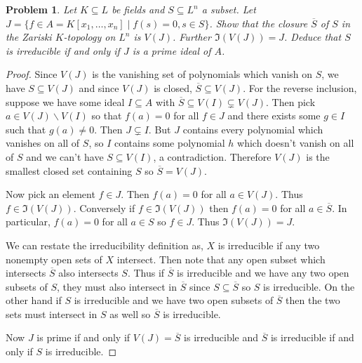 \documentclass{article}
\newtheorem{problem}{Problem}
\begin{document}
\begin{problem}
\label{zar}
Let $K \subseteq L$ be fields and $S \subseteq L^n$ a subset. Let $J = \{ f \in A = K[x_1, \dots , x_n] \mid f(s) = 0, s \in S\}$. Show that the closure $\overline{S}$ of $S$ in the Zariski $K$-topology on $L^n$ is $V(J)$. Further $\mathfrak{I}(V(J)) = J$. Deduce that $S$ is irreducible if and only if $J$ is a prime ideal of $A$.
\end{problem}
\begin{proof}
Since $V(J)$ is the vanishing set of polynomials which vanish on $S$, we have $S \subseteq V(J)$ and since $V(J)$ is closed, $\overline{S} \subseteq V(J)$. For the reverse inclusion, suppose we have some ideal $I \subseteq A$ with $\overline{S} \subseteq V(I) \subsetneq V(J)$. Then pick $a \in V(J) \backslash V(I)$ so that $f(a) = 0$ for all $f \in J$ and there exists some $g \in I$ such that $g(a) \neq 0$. Then $J \subsetneq I$. But $J$ contains every polynomial which vanishes on all of $S$, so $I$ contains some polynomial $h$ which doesn't vanish on all of $S$ and we can't have $S \subseteq V(I)$, a contradiction. Therefore $V(J)$ is the smallest closed set containing $S$ so $\overline{S} = V(J)$.

Now pick an element $f \in J$. Then $f(a) = 0$ for all $a \in V(J)$. Thus $f \in \mathfrak{I}(V(J))$. Conversely if $f \in \mathfrak{I}(V(J))$ then $f(a) = 0$ for all $a \in \overline{S}$. In particular, $f(a) = 0$ for all $a \in S$ so $f \in J$. Thus $\mathfrak{I}(V(J)) = J$.

We can restate the irreducibility definition as, $X$ is irreducible if any two nonempty open sets of $X$ intersect. Then note that any open subset which intersects $\overline{S}$ also intersects $S$. Thus if $\overline{S}$ is irreducible and we have any two open subsets of $S$, they must also intersect in $\overline{S}$ since $S \subseteq \overline{S}$ so $S$ is irreducible. On the other hand if $S$ is irreducible and we have two open subsets of $\overline{S}$ then the two sets must intersect in $S$ as well so $\overline{S}$ is irreducible.

Now $J$ is prime if and only if $V(J) = \overline{S}$ is irreducible and $\overline{S}$ is irreducible if and only if $S$ is irreducible.
\end{proof}
\end{document}
